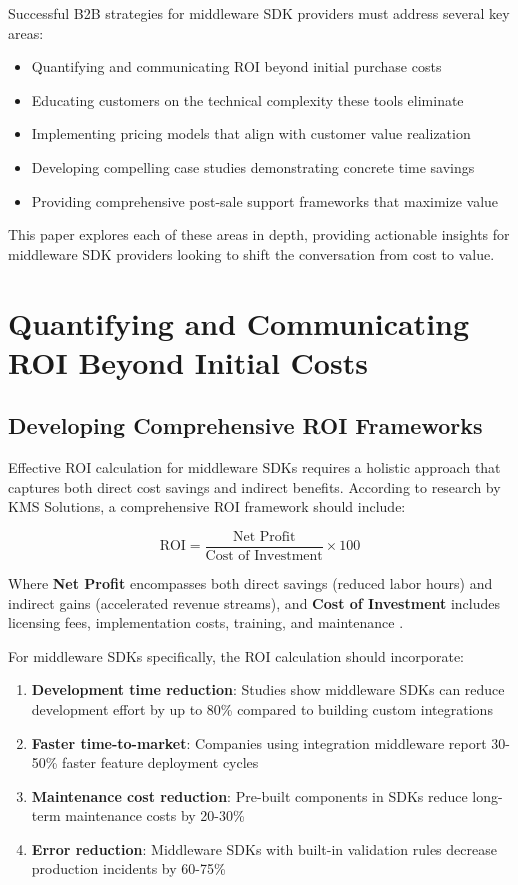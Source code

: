 \documentclass[11pt,a4paper]{article}
\begin{document}
Successful B2B strategies for middleware SDK providers must address several key areas:
\begin{itemize}
    \item Quantifying and communicating ROI beyond initial purchase costs
    \item Educating customers on the technical complexity these tools eliminate
    \item Implementing pricing models that align with customer value realization
    \item Developing compelling case studies demonstrating concrete time savings
    \item Providing comprehensive post-sale support frameworks that maximize value
\end{itemize}

This paper explores each of these areas in depth, providing actionable insights for middleware SDK providers looking to shift the conversation from cost to value.

\section{Quantifying and Communicating ROI Beyond Initial Costs}

\subsection{Developing Comprehensive ROI Frameworks}

Effective ROI calculation for middleware SDKs requires a holistic approach that captures both direct cost savings and indirect benefits. According to research by KMS Solutions, a comprehensive ROI framework should include:

\begin{equation}
\text{ROI} = \frac{\text{Net Profit}}{\text{Cost of Investment}} \times 100
\end{equation}

Where \textbf{Net Profit} encompasses both direct savings (reduced labor hours) and indirect gains (accelerated revenue streams), and \textbf{Cost of Investment} includes licensing fees, implementation costs, training, and maintenance \cite{kms2023}.

For middleware SDKs specifically, the ROI calculation should incorporate:

\begin{enumerate}
    \item \textbf{Development time reduction}: Studies show middleware SDKs can reduce development effort by up to 80\% compared to building custom integrations \cite{prismatic2023}
    \item \textbf{Faster time-to-market}: Companies using integration middleware report 30-50\% faster feature deployment cycles \cite{aws2023}
    \item \textbf{Maintenance cost reduction}: Pre-built components in SDKs reduce long-term maintenance costs by 20-30\% \cite{haveignition2023}
    \item \textbf{Error reduction}: Middleware SDKs with built-in validation rules decrease production incidents by 60-75\% \cite{haveignition2023}
\end{enumerate}
\end{document}
